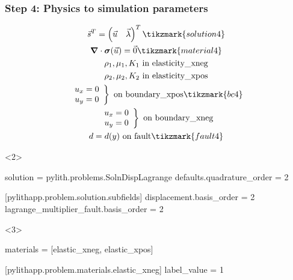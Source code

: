\documentclass[aspectratio=169]{beamer}
\begin{document}
\begin{frame}[t,fragile]
  \frametitle{Step 4: Physics to simulation parameters}
  \summary{}

  \begin{minipage}[t]{0.35\textwidth}
    {\scriptsize
    \begin{gather*}
    \vec{s}^T = \left( \vec{u} \quad \vec{\lambda} \right)^T \tikzmark{solution4}\\
    \tensor{\nabla} \cdot \tensor{\sigma}(\vec{u}) = \vec{0} \tikzmark{material4} \\
    \rho_1, \mu_1, K_1 \text{ in elasticity\_xneg} \\ 
    \rho_2, \mu_2, K_2 \text{ in elasticity\_xpos} \\ 
    \left. \begin{array}{c} u_x = 0 \\ u_y = 0 \end{array}\right\} \text{ on boundary\_xpos} \tikzmark{bc4}\\
    \left. \begin{array}{c} u_x = 0 \\ u_y = 0 \end{array}\right\} \text{ on boundary\_xneg} \\
    d = d(y) \text{ on fault} \tikzmark{fault4}
    \end{gather*}}
  \end{minipage}
  \hfill
  \begin{minipage}[t]{0.60\textwidth}
    \begin{onlyenv}<2>
      \begin{cfgcode}
        solution = pylith.problems.SolnDispLagrange
        defaults.quadrature_order = 2

        [pylithapp.problem.solution.subfields]
        displacement.basis_order = 2
        lagrange_multiplier_fault.basis_order = 2
      \end{cfgcode}
    \end{onlyenv}
    \begin{onlyenv}<3>
      \begin{cfgcode}
        materials = [elastic_xneg, elastic_xpos]

        [pylithapp.problem.materials.elastic_xneg]
        label_value = 1


\end{cfgcode}
\end{onlyenv}
\end{minipage}
\end{frame}
\end{document}
